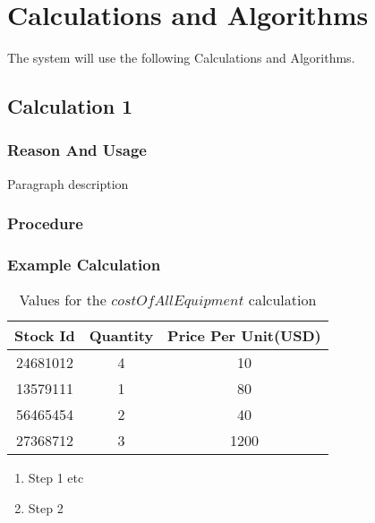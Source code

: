 \section{Calculations and Algorithms}
The system will use the following Calculations and Algorithms.

\vspace{0.5cm}
\subsection{Calculation 1}
\subsubsection{Reason And Usage}

Paragraph description

\subsubsection{Procedure}

\newpage
\subsubsection{Example Calculation}

\begin{table}[!h]
    \centering
    \setlength\tabcolsep{0pt}
    \begin{tabular}{|c|c|c|}
    \hline
    \hspace{.1 cm} Stock Id \hspace{.1 cm} & \hspace{.1 cm} Quantity \hspace{.1 cm} & \hspace{.1 cm} Price Per Unit(USD) \hspace{.1 cm}  \\ \hline
    24681012   & 4   & 10   \\ \hline
    13579111   & 1   & 80   \\ \hline
    56465454   & 2  & 40  \\ \hline
    27368712   & 3  & 1200  \\ \hline
    \end{tabular}
    \caption{Values for the \(costOfAllEquipment\) calculation}
\end{table}
\begin{enumerate}
    \item Step 1 etc
    \item Step 2
\end{enumerate}


